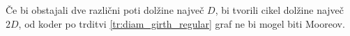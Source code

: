 \documentclass[fin1, tisk]{fmfdelo}
\begin{document}
\begin{dokaz}
    Če bi obstajali dve različni poti dolžine največ $D$, bi tvorili cikel dolžine največ $2D$, od koder
    po trditvi \ref{tr:diam_girth_regular} graf ne bi mogel biti Mooreov.
\end{dokaz}






\end{document}

